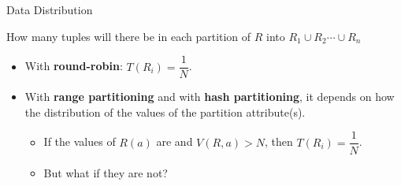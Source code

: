 \begin{frame}{Data Distribution}

How many tuples will there be in each partition of $R$ into $R_1\cup R_2 \cdots\cup R_n$

\begin{itemize}[-,topsep=-0.5em]
\item With \textbf{round-robin}: \(T(R_i) = \dfrac{1}{N}\).
\item With \textbf{range partitioning} and with \textbf{hash partitioning}, it depends on how the distribution of the values of the partition attribute(s).
\begin{itemize}[-]
\item If the values of $R(a)$ are  and $V(R,a) > N$, then \(T(R_i) = \dfrac{1}{N}\).
\item But what if they are not?
\end{itemize}
\end{itemize}
\end{frame}

%
%


